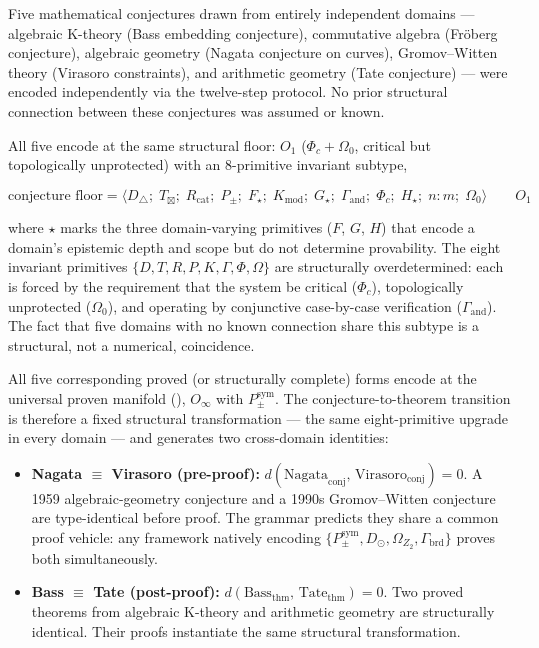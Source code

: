 \documentclass[12pt,a4paper]{article}
\newcommand{\Phic}{\Phi_c}
\newcommand{\Ppms}{P_{\pm}^{\text{sym}}}
\begin{document}
Five mathematical conjectures drawn from entirely independent domains
--- algebraic K-theory (Bass embedding conjecture), commutative algebra
(Fr{\"o}berg conjecture), algebraic geometry (Nagata conjecture on
curves), Gromov--Witten theory (Virasoro constraints), and arithmetic
geometry (Tate conjecture) --- were encoded independently via the
twelve-step protocol. No prior structural connection between these
conjectures was assumed or known.

All five encode at the same structural floor: $O_1$ ($\Phic +
\Omega_0$, critical but topologically unprotected) with an
8-primitive invariant subtype,

\begin{equation}
\text{conjecture floor} = \langle D_\triangle;\; T_\boxtimes;\;
R_\text{cat};\; P_\pm;\; F_\star;\; K_\text{mod};\; G_\star;\;
\Gamma_\text{and};\; \Phic;\; H_\star;\; n{:}m;\; \Omega_0
\rangle \qquad O_1
\label{eq:conjecture_floor}
\end{equation}

\noindent
where $\star$ marks the three domain-varying primitives ($F$, $G$,
$H$) that encode a domain's epistemic depth and scope but do not
determine provability. The eight invariant primitives
$\{D, T, R, P, K, \Gamma, \Phi, \Omega\}$ are structurally
overdetermined: each is forced by the requirement that the system be
critical ($\Phic$), topologically unprotected ($\Omega_0$), and
operating by conjunctive case-by-case verification ($\Gamma_\text{and}$).
The fact that five domains with no known connection share this subtype
is a structural, not a numerical, coincidence.

All five corresponding proved (or structurally complete) forms encode
at the universal proven manifold (),
$O_\infty$ with $\Ppms$. The conjecture-to-theorem transition is
therefore a fixed structural transformation --- the same eight-primitive
upgrade in every domain --- and generates two cross-domain identities:

\begin{itemize}
\item \textbf{Nagata $\equiv$ Virasoro (pre-proof):}
$d(\text{Nagata}_\text{conj},\, \text{Virasoro}_\text{conj}) = 0$.
A 1959 algebraic-geometry conjecture and a 1990s
Gromov--Witten conjecture are type-identical before proof.
The grammar predicts they share a common proof vehicle: any
framework natively encoding $\{\Ppms, D_\odot, \Omega_{Z_2},
\Gamma_\text{brd}\}$ proves both simultaneously.

\item \textbf{Bass $\equiv$ Tate (post-proof):}
$d(\text{Bass}_\text{thm},\, \text{Tate}_\text{thm}) = 0$.
Two proved theorems from algebraic K-theory and arithmetic
geometry are structurally identical. Their proofs instantiate the
same structural transformation.
\end{itemize}
\end{document}
